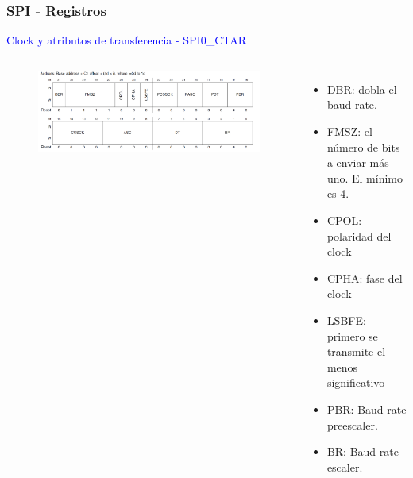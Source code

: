 \documentclass[10.5pt,scale=1.0,t,aspectratio=169,hyperref={pdfpagelabels=false}]{beamer}
\begin{document}
\begin{frame}
	\frametitle{SPI - Registros}
	{\small
		\textcolor{blue}{Clock y atributos de transferencia - SPI0\_CTAR}
		
		\begin{columns}
			\begin{figure}
				\centering
				\includegraphics[scale=0.25]{14_SPICTAR}
			\end{figure}
			
			\begin{itemize}
				\item DBR: dobla el baud rate.
				\item FMSZ: el número de bits a enviar más uno. El mínimo es 4.
				\item CPOL: polaridad del clock
				\item CPHA: fase del clock
				\item LSBFE: primero se transmite el menos significativo
				\item PBR: Baud rate preescaler.
				\item BR: Baud rate escaler.
			\end{itemize}
		\end{columns}
	}
\end{frame}
\end{document}
